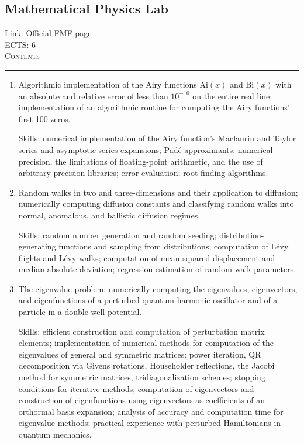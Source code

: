 \documentclass[11pt, a4paper]{article}
\newenvironment{course}[3]{
\subsection{#1}%
Link: \href{#2}{Official FMF page}\\%
ECTS: #3%
\vspace{1ex}
\\
{\large \textsc{Contents}}\\[-0.9ex]%
\rule{\textwidth}{0.5pt}
\vspace{-3ex}
}
{}
\newenvironment{chapter}[1]{
\begin{tcolorbox}[title=#1, breakable]
}
{\end{tcolorbox}}
\begin{document}
\begin{course}{Mathematical Physics Lab}{https://www.fmf.uni-lj.si/en/study-physics/programmes/1fiz/2020/7000777/courses/1159/}{6}
    \label{mathematical-physics-lab}
    
    \begin{chapter}{Projects}
        \begin{enumerate}
        
            \item Algorithmic implementation of the Airy functions $ \mathrm{Ai}(x) $ and $ \mathrm{Bi}(x) $ with an absolute and relative error of less than $ 10^{-10} $ on the entire real line; implementation of an algorithmic routine for computing the Airy functions' first 100 zeros.

            Skills: numerical implementation of the Airy function's Maclaurin and Taylor series and asymptotic series expansions; Padé approximants; numerical precision, the limitations of floating-point arithmetic, and the use of arbitrary-precision libraries; error evaluation; root-finding algorithms.

            \item Random walks in two and three-dimensions and their application to diffusion; numerically computing diffusion constants and classifying random walks into normal, anomalous, and ballistic diffusion regimes.

            Skills: random number generation and random seeding; distribution-generating functions and sampling from distributions; computation of Lévy flights and Lévy walks; computation of mean squared displacement and median absolute deviation; regression estimation of random walk parameters.

            \item The eigenvalue problem: numerically computing the eigenvalues, eigenvectors, and eigenfunctions of a perturbed quantum harmonic oscillator and of a particle in a double-well potential.

            Skills: efficient construction and computation of perturbation matrix elements;
            implementation of numerical methods for computation of the eigenvalues of general and symmetric matrices: power iteration, QR decomposition via Givens rotations, Householder reflections, the Jacobi method for symmetric matrices, tridiagonalization schemes; stopping conditions for iterative methods;
            computation of eigenvectors and construction of eigenfunctions using eigenvectors as coefficients of an orthormal basis expansion;
            analysis of accuracy and computation time for eigenvalue methods; 
            practical experience with perturbed Hamiltonians in quantum mechanics.


\end{enumerate}
\end{chapter}
\end{course}
\end{document}
